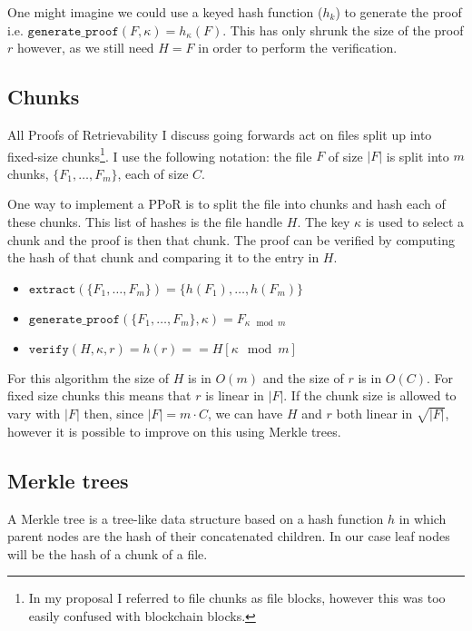 \documentclass[12pt,a4paper,twoside,openright]{report}
\begin{document}
One might imagine we could use a keyed hash function ($h_k$) to generate the proof
i.e. $\texttt{generate\_proof}(F, \kappa) = h_\kappa(F)$.
This has only shrunk the size of the proof $r$ however, as we still need ${H}  = F$ in order to perform the verification.


\subsection{Chunks}\label{por-chunks}

All Proofs of Retrievability I discuss going forwards act on files split up into fixed-size chunks\footnote{
In my proposal I referred to file chunks as file blocks, however this was too easily confused with blockchain blocks.}.
I use the following notation:
the file $F$ of size $|F|$ is split into $m$ chunks, $\{F_1, \ldots, F_m\}$, each of size $C$.

One way to implement a PPoR is to split the file into chunks and hash each of these chunks.
This list of hashes is the file handle ${H}$.
The key $\kappa$ is used to select a chunk and the proof is then that chunk.
The proof can be verified by computing the hash of that chunk and comparing it to the entry in ${H}$.

\begin{itemize}
\item $\texttt{extract}(\{F_1, \ldots, F_m\}) = \{h(F_1), \ldots, h(F_m)\}$


\item $\texttt{generate\_proof}(\{F_1, \ldots, F_m\}, \kappa) = F_{\kappa \mod m}$

\item $\texttt{verify}({H}, \kappa, r) = h(r) == {H}[\kappa \mod m]$
\end{itemize}

For this algorithm the size of ${H}$ is in $O(m)$ and the size of $r$ is in $O(C)$.
For fixed size chunks this means that $r$ is linear in $|F|$.
If the chunk size is allowed to vary with $|F|$ then, since $|F| = m \cdot C$, we can have ${H}$ and $r$ both linear in $\sqrt{|F|}$,
however it is possible to improve on this using Merkle trees.



\subsection{Merkle trees}

A Merkle tree is a tree-like data structure based on a hash function $h$ in which parent nodes are the hash of their concatenated children.
In our case leaf nodes will be the hash of a chunk of a file.
\end{document}
